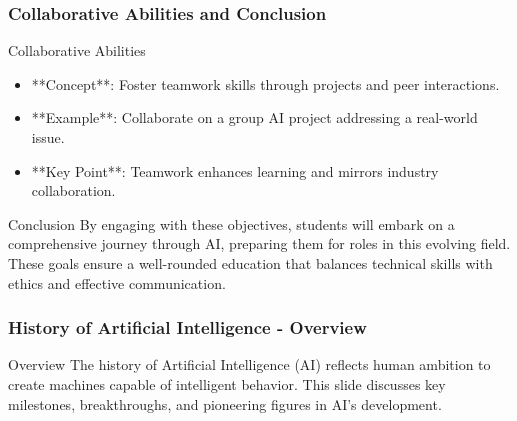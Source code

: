 \documentclass[aspectratio=169]{beamer}
\begin{document}
\begin{frame}[fragile]
    \frametitle{Collaborative Abilities and Conclusion}
    \begin{block}{Collaborative Abilities}
        \begin{itemize}
            \item **Concept**: Foster teamwork skills through projects and peer interactions.
            \item **Example**: Collaborate on a group AI project addressing a real-world issue.
            \item **Key Point**: Teamwork enhances learning and mirrors industry collaboration.
        \end{itemize}
    \end{block}
    
    \begin{block}{Conclusion}
        By engaging with these objectives, students will embark on a comprehensive journey through AI, preparing them for roles in this evolving field. These goals ensure a well-rounded education that balances technical skills with ethics and effective communication.
    \end{block}
\end{frame}

\begin{frame}[fragile]
    \frametitle{History of Artificial Intelligence - Overview}
    \begin{block}{Overview}
        The history of Artificial Intelligence (AI) reflects human ambition to create machines capable of intelligent behavior. This slide discusses key milestones, breakthroughs, and pioneering figures in AI's development.
    \end{block}
\end{frame}
\end{document}
